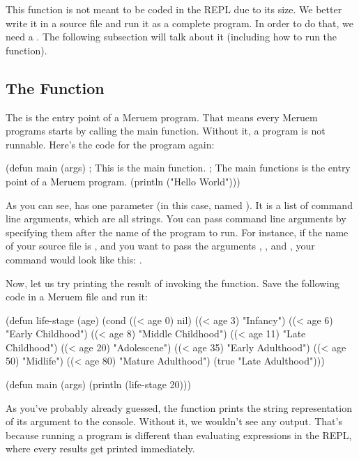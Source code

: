 This function is not meant to be coded in the REPL due to its size. We better write it in a source file and run it as a complete program. In order to do that, we need a . The following subsection will talk about it (including how to run the  function).

\subsection{The  Function}
The  is the entry point of a Meruem program. That means every Meruem programs starts by calling the main function. Without it, a program is not runnable. Here's the code for the  program again:

\begin{REPL}
(defun main (args)    ; This is the main function.
  ; The main functions is the entry point of a Meruem program.
  (println ("Hello World")))
\end{REPL}

As you can see,  has one parameter (in this case, named ). It is a list of command line arguments, which are all strings. You can pass command line arguments by specifying them after the name of the program to run. For instance, if the name of your source file is , and you want to pass the arguments , , and , your command would look like this: .

Now, let us try printing the result of invoking the  function. Save the following code in a Meruem file and run it:

\begin{Meruem}
(defun life-stage (age)
   (cond 
     ((< age 0) nil)
     ((< age 3) "Infancy")
     ((< age 6) "Early Childhood")
     ((< age 8) "Middle Childhood")
     ((< age 11) "Late Childhood")
     ((< age 20) "Adolescene")
     ((< age 35) "Early Adulthood")
     ((< age 50) "Midlife")
     ((< age 80) "Mature Adulthood")
     (true "Late Adulthood")))

(defun main (args)
  (println (life-stage 20)))
\end{Meruem}

As you've probably already guessed, the  function prints the string representation of its argument to the console. Without it, we wouldn't see any output. That's because running a program is different than evaluating expressions in the REPL, where every results get printed immediately.

